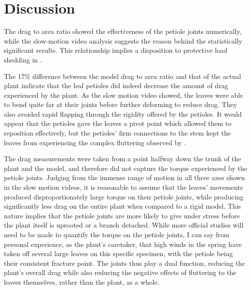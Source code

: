 \section{Discussion}

The drag to area ratio showed the effectiveness of the petiole joints numerically, while the slow-motion video analysis suggests the reason behind the statistically significant results. This relationship implies a disposition to protective load shedding in \Cxparadisi.

The 17\% difference between the model drag to area ratio and that of the actual plant indicate that the leaf petioles did indeed decrease the amount of drag experienced by the plant. As the slow motion video showed, the leaves were able to bend quite far at their joints before further deforming to reduce drag. They also avoided rapid flapping through the rigidity offered by the petioles. It would appear that the petioles gave the leaves a pivot point which allowed them to reposition effectively, but the petioles' firm connections to the stem kept the leaves from experiencing the complex fluttering observed by \citet{Miller,et al,2012}.

The drag measurements were taken from a point halfway down the trunk of the plant and the model, and therefore did not capture the torque experienced by the petiole joints. Judging from the immense range of motion in all three axes shown in the slow motion videos, it is reasonable to assume that the leaves' movements produced disproportionately large torque on their petiole joints, while producing significantly less drag on the entire plant when compared to a rigid model. This nature implies that the petiole joints are more likely to give under stress before the plant itself is uprooted or a branch detached. While more official studies will need to be made to quantify the torque on the petiole joints, I can say from personal experience, as the plant's caretaker, that high winds in the spring have taken off several large leaves on this specific specimen, with the petiole being their consistent fracture point. The joints thus play a dual function, reducing the plant's overall drag while also reducing the negative effects of fluttering to the leaves themselves, rather than the plant, as a whole.
